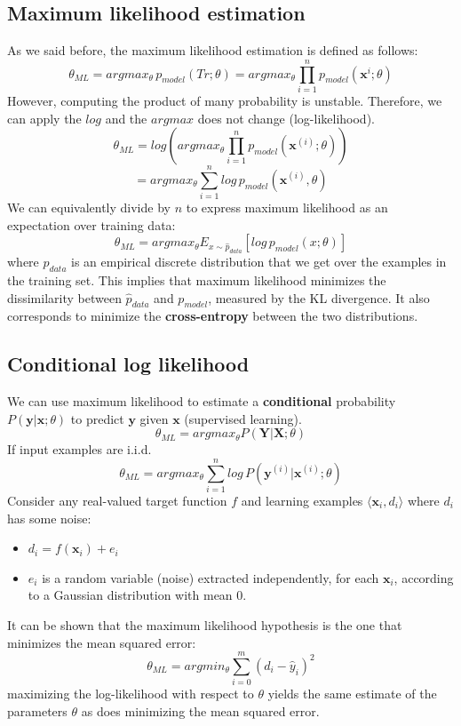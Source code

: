  \subsection{Maximum likelihood estimation}
 As we said before, the maximum likelihood estimation is defined as follows:
 \[\theta_{ML} = argmax_{\theta}\, p_{model}(Tr; \theta) = argmax_{\theta}\prod_{i = 1}^{n}p_{model}(\textbf{x}^{i}; \theta)\]
 However, computing the product of many probability is unstable. Therefore, we can apply the $log$ and the $argmax$ does not change (log-likelihood).
 \[\theta_{ML} = log(argmax_{\theta}\prod_{i=1}^{n}p_{model}(\textbf{x}^{(i)}; \theta))\]
 \[= argmax_{\theta}\sum_{i = 1}^{n}log\, p_{model}(\textbf{x}^{(i)}, \theta)\]
 We can equivalently divide by $n$ to express maximum likelihood as an expectation over training data:
 \[\theta_{ML} = argmax_{\theta}E_{x \sim \hat{p}_{data}}[log \, p_{model}(x; \theta)]\]
where $\hat{p}_{data}$ is an empirical discrete distribution that we get over the examples in the training set. This implies that maximum likelihood minimizes the dissimilarity between $\hat{p}_{data}$ and $p_{model}$, measured by the KL divergence. It also corresponds to minimize the \textbf{cross-entropy} between the two distributions.

\subsection{Conditional log likelihood}
We can use maximum likelihood to estimate a \textbf{conditional} probability $P(\textbf{y} | \textbf{x}; \theta)$ to predict $\textbf{y}$ given $\textbf{x}$ (supervised learning).
\[\theta_{ML} = argmax_{\theta} P(\textbf{Y} | \textbf{X}; \theta)\]
If input examples are i.i.d.
\[\theta_{ML} = argmax_{\theta}\sum_{i=1}^{n}log\, P(\textbf{y}^{(i)} | \textbf{x}^{(i)}; \theta)\]
Consider any real-valued target function $f$ and learning examples $\langle 
 \textbf{x}_{i}, d_{i}\rangle$ where $d_{i}$ has some noise:
 \begin{itemize}
     \item $d_{i} = f(\textbf{x}_{i}) + e_{i}$
     \item $e_{i}$ is a random variable (noise) extracted independently, for each $\textbf{x}_{i}$, according to a Gaussian distribution with mean 0.
 \end{itemize}
 It can be shown that the maximum likelihood hypothesis is the one that minimizes the mean squared error:
 \[\theta_{ML} = argmin_{\theta} \sum_{i=0}^{m}(d_{i} - \hat{y}_{i})^{2}\]
maximizing the log-likelihood with respect to $\theta$ yields the same estimate of the parameters $\theta$ as does minimizing the mean squared error.

